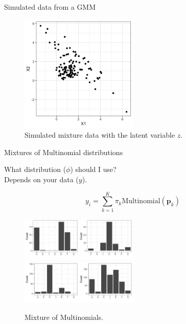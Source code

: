 \documentclass[10pt]{beamer}
\begin{document}
\begin{frame}{Simulated data from a GMM}

\begin{figure}[h]
\centering
\includegraphics[width=0.5\textwidth]{fig/mix_models.png}
\caption{Simulated mixture data with the latent variable $z$.}
\end{figure}

\end{frame}


\begin{frame}{Mixtures of Multinomial distributions}

What {\color{uured} distribution} ($\phi$) should I use?\\
\pause
\vspace{2mm}
Depends on your {\color{uured} data} ($y$).
\pause

\[
y_i = \sum_{k=1}^K \pi_k \text{Multinomial}(\mathbf{p}_k)
\]

\begin{figure}[h]
\centering
\includegraphics[width=0.25\textwidth]{fig/clu1.png}\includegraphics[width=0.25\textwidth]{fig/clu2.png}\\
\includegraphics[width=0.25\textwidth]{fig/clu3.png}\includegraphics[width=0.25\textwidth]{fig/clu4.png}
\caption{Mixture of Multinomials.}
\end{figure}

\end{frame}
\end{document}
